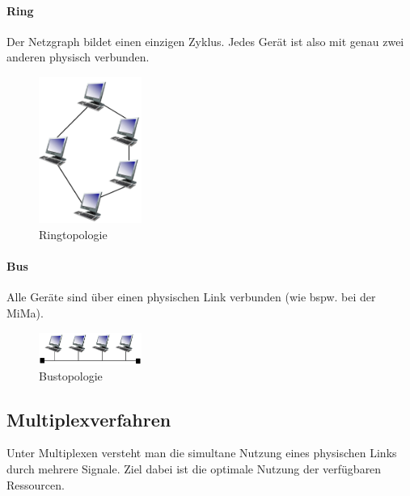 \documentclass[a4paper, 14pt]{article}
\begin{document}
	\paragraph{Ring}

	Der Netzgraph bildet einen einzigen Zyklus.
	Jedes Gerät ist also mit genau zwei anderen physisch verbunden.

	\begin{figure}
		\begin{center}
			\includegraphics[width=0.3\textwidth]{images/04-ring-topology.png}
		\end{center}
		\caption{Ringtopologie}
	\end{figure}

	\paragraph{Bus}

	Alle Geräte sind über einen physischen Link verbunden (wie bspw. bei der MiMa).

	\begin{figure}
		\begin{center}
			\includegraphics[width=0.3\textwidth]{images/04-bus-topology.png}
		\end{center}
		\caption{Bustopologie}
	\end{figure}

	\subsection{Multiplexverfahren}

	Unter Multiplexen versteht man die simultane Nutzung eines physischen Links durch mehrere Signale.
	Ziel dabei ist die optimale Nutzung der verfügbaren Ressourcen.
\end{document}
